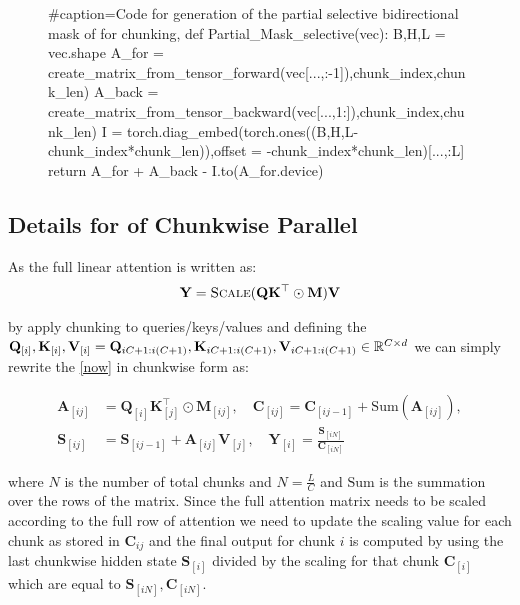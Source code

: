 \begin{figure}[t]
\hspace{5mm}\begin{minipage}[t]{0.95\columnwidth} 
    \centering
    \begin{python}[framerule=0.3
    mm , rulecolor=\color{black} ,frame=single]
#caption=Code for generation of the partial selective bidirectional mask of \lion for chunking, 
def Partial_Mask_selective(vec):
    B,H,L = vec.shape
    A_for = create_matrix_from_tensor_forward(vec[...,:-1]),chunk_index,chunk_len)
    A_back = create_matrix_from_tensor_backward(vec[...,1:]),chunk_index,chunk_len)
    I  = torch.diag_embed(torch.ones((B,H,L-chunk_index*chunk_len)),offset = -chunk_index*chunk_len)[...,:L]
    return A_for + A_back - I.to(A_for.device)

\end{python}
\end{minipage}
\end{figure}

\subsection{Details for \lion  of Chunkwise Parallel} \label{detailchunk}

As the full linear attention is written as:
\begin{align}
\label{now}
    \mathbf{Y} = \textsc{Scale}(\mathbf{Q}\mathbf{K}^\top \odot \mathbf{M})\mathbf{V}
\end{align}

by apply chunking to queries/keys/values and defining the $\mathbf{Q}_{[i]},\mathbf{K}_{[i]},\mathbf{V}_{[i]} = \mathbf{Q}_{iC+1:i(C+1)},\mathbf{K}_{iC+1:i(C+1)},\mathbf{V}_{iC+1:i(C+1)} \in \mathbb{R}^{C\times d}$ we can simply rewrite the \cref{now} in chunkwise form as:

\begin{align}
\label{nowresss}
     \mathbf{A}_{[ij]} & = \mathbf{Q}_{[i]}\mathbf{K}_{[j]}^\top \odot \mathbf{M}_{[ij]}, \quad \mathbf{C}_{[ij]} = \mathbf{C}_{[ij-1]} + \text{Sum} (\mathbf{A}_{[ij]}), \\
     \mathbf{S}_{[ij]} & =\mathbf{S}_{[ij-1]} + \mathbf{A}_{[ij]} \mathbf{V}_{[j]} , \quad \mathbf{Y}_{[i]} = \frac{\mathbf{S}_{[iN]}}{\mathbf{C}_{[iN]}}
\end{align}

where $N$ is the number of total chunks and $N=\frac{L}{C}$ and $\text{Sum}$ is the summation over the rows of the matrix. Since the full attention matrix needs to be scaled according to the full row of attention we need to update the scaling value for each chunk as stored in $\mathbf{C}_{ij}$ and the final output for chunk $i$ is computed by using the last chunkwise hidden state $\mathbf{S}_{[i]}$ divided by the scaling for that chunk $\mathbf{C}_{[i]}$ which are equal to ${\mathbf{S}_{[iN]}},{\mathbf{C}_{[iN]}}$.

